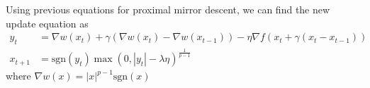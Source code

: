 Using previous equations for proximal mirror descent, we can find the new update equation as 
\begin{align*}
y_t &= \nabla w(x_t) + \gamma (\nabla w(x_t)-\nabla w(x_{t-1})) - \eta \nabla f(x_t+\gamma (x_t-x_{t-1}))\\
x_{t+1} &= \text{sgn}(y_t) \max(0, |y_t| - \lambda \eta)^{\frac{1}{p-1}}
\end{align*}
where $\nabla w(x) = |x|^{p-1} \text{sgn}(x)$
